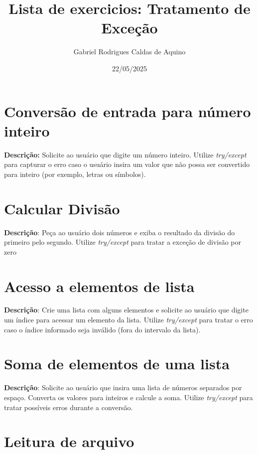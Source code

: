 \title{Lista de exercicios: Tratamento de Exceção}
\author{Gabriel Rodrigues Caldas de Aquino}
\date{22/05/2025}



\maketitle

\section{Conversão de entrada para número inteiro}

\textbf{Descrição:}
Solicite ao usuário que digite um número inteiro. Utilize \textit{try/except} para capturar o erro caso o usuário insira um valor que não possa ser convertido para inteiro (por exemplo, letras ou símbolos).

\section{Calcular Divisão}

\textbf{Descrição}:
Peça ao usuário dois números e exiba o resultado da divisão do primeiro pelo segundo. Utilize \textit{try/except} para tratar a exceção de divisão por zero

\section{Acesso a elementos de lista}

\textbf{Descrição}:
Crie uma lista com alguns elementos e solicite ao usuário que digite um índice para acessar um elemento da lista. Utilize \textit{try/except} para tratar o erro caso o índice informado seja inválido (fora do intervalo da lista).

\section{Soma de elementos de uma lista}

\textbf{Descrição}:
Solicite ao usuário que insira uma lista de números separados por espaço. Converta os valores para inteiros e calcule a soma. Utilize \textit{try/except} para tratar possíveis erros durante a conversão.

\section{Leitura de arquivo}

